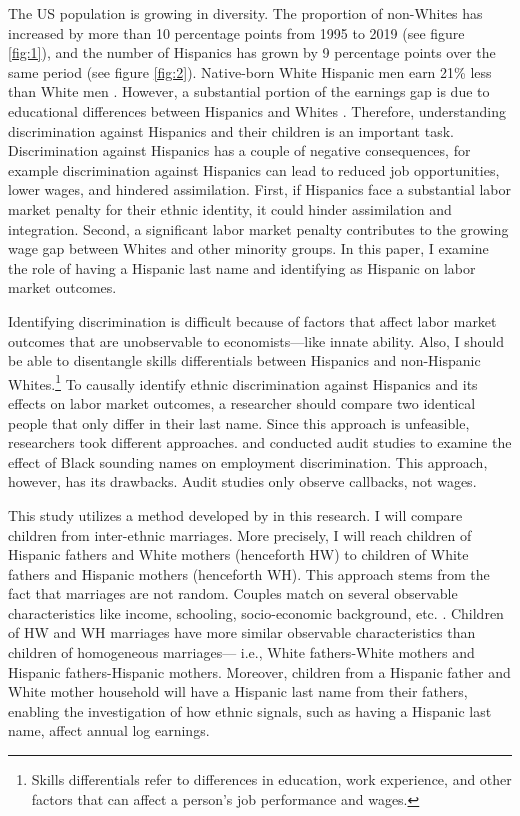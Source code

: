\documentclass[12pt, fullpage]{article}
\begin{document}
The US population is growing in diversity. The proportion of non-Whites has increased by more than 10 percentage points from 1995 to 2019 (see figure \ref{fig:1}), and the number of Hispanics has grown by 9 percentage points over the same period (see figure \ref{fig:2}). Native-born White Hispanic men earn 21\% less than White men \citep{duncan2018identifying}. However, a substantial portion of the earnings gap is due to educational differences between Hispanics and Whites \citep{duncan2006hispanics, duncan2018socioeconomic}. Therefore, understanding discrimination against Hispanics and their children is an important task. Discrimination against Hispanics has a couple of negative consequences, for example discrimination against Hispanics can lead to reduced job opportunities, lower wages, and hindered assimilation. First, if Hispanics face a substantial labor market penalty for their ethnic identity, it could hinder assimilation and integration. Second, a significant labor market penalty contributes to the growing wage gap between Whites and other minority groups. In this paper, I examine the role of having a Hispanic last name and identifying as Hispanic on labor market outcomes. 

Identifying discrimination is difficult because of factors that affect labor market outcomes that are unobservable to economists---like innate ability. Also, I should be able to disentangle skills differentials between Hispanics and non-Hispanic Whites.\footnote{Skills differentials refer to differences in education, work experience, and other factors that can affect a person's job performance and wages.} To causally identify ethnic discrimination against Hispanics and its effects on labor market outcomes, a researcher should compare two identical people that only differ in their last name. Since this approach is unfeasible, researchers took different approaches. \citet{bertrand2004emily} and \citet{fryer2004causes} conducted audit studies to examine the effect of Black sounding names on employment discrimination. This approach, however, has its drawbacks. Audit studies only observe callbacks, not wages. 

This study utilizes a method developed by \citet{rubinstein2014pride} in this research. I will compare children from inter-ethnic marriages. More precisely, I will reach children of Hispanic fathers and White mothers (henceforth HW) to children of White fathers and Hispanic mothers (henceforth  WH). This approach stems from the fact that marriages are not random. Couples match on several observable characteristics like income, schooling, socio-economic background, etc. \citep{averettBetterWorseRelationship2008, averettEconomicRealityBeauty1996, beckerTheoryMarriagePart1973, beckerTheoryMarriagePart1974, beckerTreatiseFamily1993, browningCollectiveUnitaryModels2006, chiapporiFatterAttractionAnthropometric2012}. Children of HW and WH marriages have more similar observable characteristics than children of homogeneous marriages--- i.e., White fathers-White mothers and Hispanic fathers-Hispanic mothers. Moreover, children from a Hispanic father and White mother household will have a Hispanic last name from their fathers, enabling the investigation of how ethnic signals, such as having a Hispanic last name, affect annual log earnings.
\end{document}
